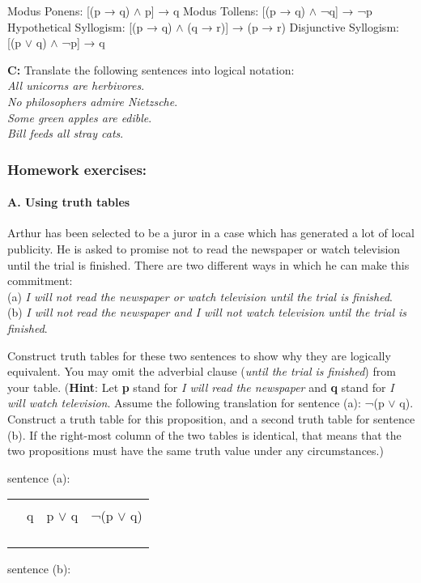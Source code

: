 \ea
\ea Modus Ponens:  [(p → q) ${\wedge}$ p]  →  q
\ex Modus Tollens:  [(p → q) ${\wedge}$ ¬q]  →  ¬p
\ex Hypothetical Syllogism:  [(p → q) ${\wedge}$ (q → r)]  →  (p → r)
\ex Disjunctive Syllogism:  [(p $\vee$ q) ${\wedge}$ ¬p]  →  q
                       \z
                       \z

\ea
\textbf{C:} Translate the following sentences into logical notation:\\
\ea \textit{All unicorns are herbivores}.\\
\ex \textit{No philosophers admire Nietzsche}.\\
\ex \textit{Some green apples are edible}.\\
\ex \textit{Bill feeds all stray cats}.
                       \z
\z

\subsubsection{Homework exercises:}\label{sec:}
\paragraph{A. Using truth tables}

Arthur has been selected to be a juror in a case which has generated a lot of local publicity. He is asked to promise not to read the newspaper or watch television until the trial is finished. There are two different ways in which he can make this commitment:\\
(a) \textit{I will not read the newspaper or watch television until the trial is finished}.\\
(b) \textit{I will not read the newspaper and I will not watch television until the trial is finished}. 

Construct truth tables for these two sentences to show why they are logically equivalent. You may omit the adverbial clause (\textit{until the trial is finished}) from your table.  (\textbf{Hint}: Let \textbf{p} stand for \textit{I will read the newspaper} and \textbf{q} stand for \textit{I will watch television}. Assume the following translation for sentence (a): ¬(p $\vee$ q). Construct a truth table for this proposition, and a second truth table for sentence (b). If the right-most column of the two tables is identical, that means that the two propositions must have the same truth value under any circumstances.)

sentence (a):

\begin{tabularx}{\textwidth}{XXXX} &  &  & \\
\lsptoprule
\tablehead{
 p & q & p $\vee$ q & ¬(p $\vee$ q)\\
}
&  &  & \\
&  &  & \\
&  &  & \\
\lspbottomrule
\end{tabularx}
sentence (b):

